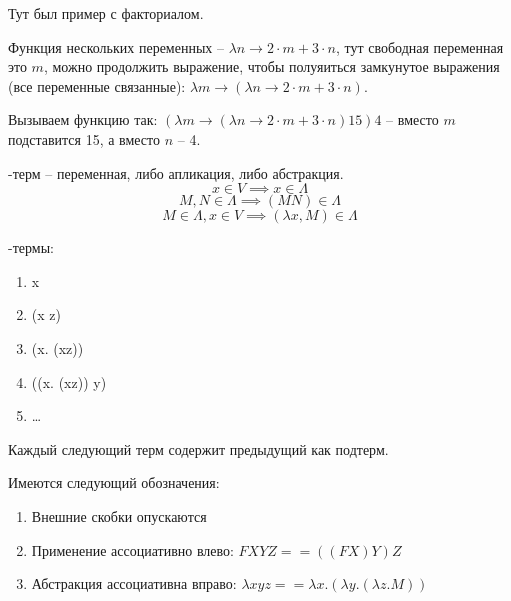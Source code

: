 \begin{example}
    Тут был пример с факториалом.
\end{example}

\begin{definition}
    Функция нескольких переменных -- $\lambda n \rightarrow 2 \cdot m + 3 \cdot n$, тут свободная переменная это $m$, можно продолжить выражение, чтобы полуяиться замкунутое выражения (все переменные связанные): $\lambda m \rightarrow (\lambda n \rightarrow 2 \cdot m + 3 \cdot n)$.

    Вызываем функцию так: $(\lambda m \rightarrow (\lambda n \rightarrow 2 \cdot m + 3 \cdot n) 15) 4$ -- вместо $m$ подставится 15, а вместо $n$ -- 4.
\end{definition}


\begin{definition}
    \lambda-терм -- переменная, либо апликация, либо абстракция. 
    $$x \in V \implies x \in \Lambda$$
    $$M, N \in \Lambda \implies (MN) \in \Lambda$$
    $$M \in \Lambda, x \in V \implies (\lambda x, M) \in \Lambda$$
\end{definition}
\begin{example}
    \lambda-термы:
    \begin{enumerate}
        \item x
        \item (x z)
        \item (\lambda x. (xz))
        \item ((\lambda x. (xz)) y)
        \item \dots
    \end{enumerate}
    Каждый следующий терм содержит предыдущий как подтерм.
\end{example}

\begin{remark}
    Имеются следующий обозначения:
    \begin{enumerate}
        \item  Внешние скобки опускаются
        \item Применение ассоциативно влево: $FXYZ == ((FX)Y)Z$
        \item Абстракция ассоциативна вправо: $\lambda x y z == \lambda x. (\lambda y. (\lambda z. M))$
    \end{enumerate}
\end{remark}

